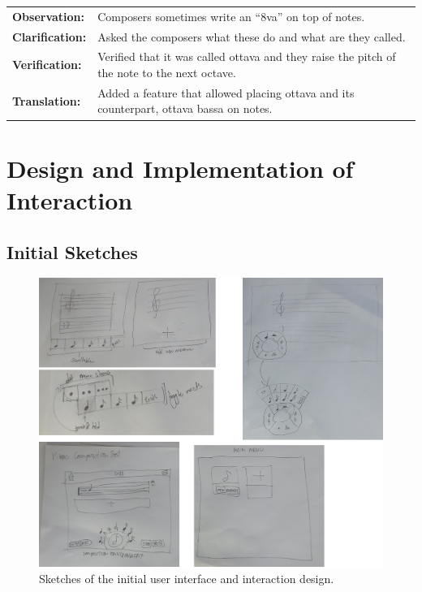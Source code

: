 \begin{longtable}{|p{2.5cm} p{12.5cm}|}
		  	\textbf{Observation:} 	& Composers sometimes write an ``8va'' on top of notes. \\
		  	\textbf{Clarification:} 	& Asked the composers what these do and what are they called. \\
		  	\textbf{Verification:} 	& Verified that it was called ottava and they raise the pitch of the note to the next octave. \\
		  	\textbf{Translation:} 	& Added a feature that allowed placing ottava and its counterpart, ottava bassa on notes. \\
		  	\hline
		\end{longtable}

	\section{Design and Implementation of Interaction}
	\label{sec:design}

		\subsection{Initial Sketches}

			\begin{figure}[H]
				\centering
				\includegraphics[scale=0.3]{figures/initial_sketches.png}
			    \caption{Sketches of the initial user interface and interaction design.}
			    \label{fig:initial_sketches}
			\end{figure}

